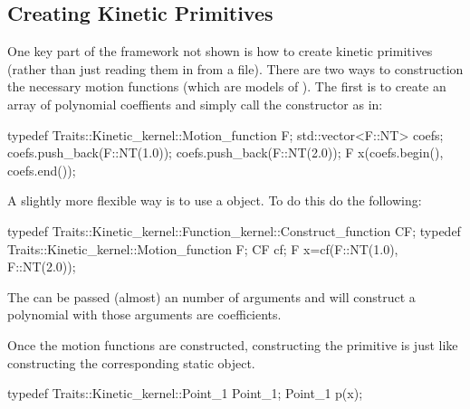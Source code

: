 
\subsection{Creating Kinetic Primitives}

One key part of the framework not shown is how to create kinetic
primitives (rather than just reading them in from a file). There are
two ways to construction the necessary motion functions (which are
models of ). The first is to
create an array of polynomial coeffients and simply call the
constructor as in:
\begin{ccExampleCode}
typedef Traits::Kinetic_kernel::Motion_function F;
std::vector<F::NT> coefs;
coefs.push_back(F::NT(1.0));
coefs.push_back(F::NT(2.0));
F x(coefs.begin(), coefs.end());
\end{ccExampleCode}

A slightly more flexible way is to use a
 object. To do this do the following:
\begin{ccExampleCode}
typedef Traits::Kinetic_kernel::Function_kernel::Construct_function
CF; typedef Traits::Kinetic_kernel::Motion_function F; CF cf; F
x=cf(F::NT(1.0), F::NT(2.0));
\end{ccExampleCode}
The  can be passed
(almost) an number of arguments and will construct a polynomial with
those arguments are coefficients.

Once the motion functions are constructed, constructing the primitive
is just like constructing the corresponding static object.
\begin{ccExampleCode}
typedef Traits::Kinetic_kernel::Point_1 Point_1;
Point_1 p(x);
\end{ccExampleCode}
